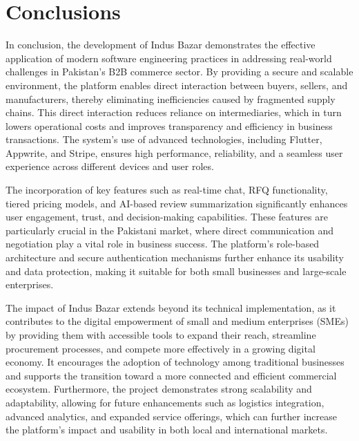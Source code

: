 \chapter{Conclusions}\label{chap:conclusions}

In conclusion, the development of Indus Bazar demonstrates the effective application of modern software engineering practices in addressing real-world challenges in Pakistan's B2B commerce sector. By providing a secure and scalable environment, the platform enables direct interaction between buyers, sellers, and manufacturers, thereby eliminating inefficiencies caused by fragmented supply chains. This direct interaction reduces reliance on intermediaries, which in turn lowers operational costs and improves transparency and efficiency in business transactions. The system's use of advanced technologies, including Flutter, Appwrite, and Stripe, ensures high performance, reliability, and a seamless user experience across different devices and user roles. 

The incorporation of key features such as real-time chat, RFQ functionality, tiered pricing models, and AI-based review summarization significantly enhances user engagement, trust, and decision-making capabilities. These features are particularly crucial in the Pakistani market, where direct communication and negotiation play a vital role in business success. The platform's role-based architecture and secure authentication mechanisms further enhance its usability and data protection, making it suitable for both small businesses and large-scale enterprises. 

The impact of Indus Bazar extends beyond its technical implementation, as it contributes to the digital empowerment of small and medium enterprises (SMEs) by providing them with accessible tools to expand their reach, streamline procurement processes, and compete more effectively in a growing digital economy. It encourages the adoption of technology among traditional businesses and supports the transition toward a more connected and efficient commercial ecosystem. Furthermore, the project demonstrates strong scalability and adaptability, allowing for future enhancements such as logistics integration, advanced analytics, and expanded service offerings, which can further increase the platform's impact and usability in both local and international markets.


